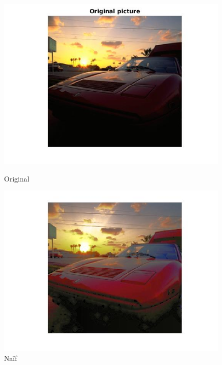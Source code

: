 \documentclass{article}
\begin{document}
\begin{figure}[h]
\centering
\begin{minipage}{0.33\textwidth}
\centering
\includegraphics[width=1\textwidth]{images/ferrari_conc_depart.jpg}
\caption{Original}
\end{minipage}%
\begin{minipage}{0.33\textwidth}
\centering
\includegraphics[width=1\textwidth]{images/ferrari_conc_inter.jpg}
\caption{Naïf}
\end{minipage}%
\begin{minipage}{0.33\textwidth}
\centering

\end{minipage}
\end{figure}
\end{document}
